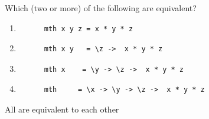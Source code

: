 \documentclass{article}
\begin{document}
\pagebreak
\begin{exercise}
Which (two or more) of the following are equivalent? 
\begin{enumerate}
     \item  \begin{lstlisting}
      mth x y z = x * y * z
    \end{lstlisting}

    \item  \begin{lstlisting}
      mth x y   = \z ->  x * y * z
    \end{lstlisting}

    \item  \begin{lstlisting}
      mth x    = \y -> \z ->  x * y * z
    \end{lstlisting}

    \item  \begin{lstlisting}
      mth     = \x -> \y -> \z ->  x * y * z
    \end{lstlisting}
  \end{enumerate}
\end{exercise}
\begin{solution}
  All are equivalent to each other
\end{solution}
\end{document}
